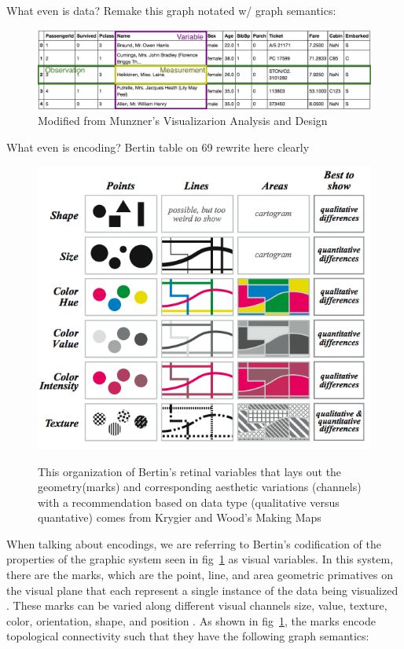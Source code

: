 \documentclass[letterpaper,onecolumn,titlepage]{Ythesis}
\begin{document}
 What even is data?
 Remake this graph notated w/ graph semantics:
 \begin{figure}
    \includegraphics{figures/intro/data_formatting}
    \caption{Modified from Munzner's Visualizarion Analysis and Design}
 \end{figure}

 What even is encoding?
Bertin table on 69 rewrite here clearly  
 \begin{figure}
 \end{figure}
 \begin{figure}
    \includegraphics{figures/intro/retinal_variables}
    \label{fig:retinal_variable}
    \caption{This organization of Bertin's retinal variables \cite{bertinSemiologyGraphicsDiagrams2011} that lays out the geometry(marks) and corresponding aesthetic variations (channels) with a recommendation based on data type (qualitative versus quantative) comes from Krygier and Wood's Making Maps \cite{krygierMakingMapsVisual2005}}
\end{figure}

When talking about encodings, we are referring to Bertin's codification of the properties of the graphic system \cite{bertinIIPropertiesGraphic2011} seen in fig~\ref{fig:retinal_variable} as visual variables. In this system, there are the marks, which are the point, line, and area geometric primatives on the visual plane that each represent a single instance of the data being visualized \cite{bertinIIPropertiesGraphic2011,munznerMarksChannels2014}. These marks can be varied along different visual channels  size, value, texture, color, orientation, shape, and position \cite{bertinIIPropertiesGraphic2011, munznerMarksChannels2014}. As shown in fig~\ref{fig:retinal_variable}, the marks encode topological connectivity such that they have the following graph semantics:
\end{document}
